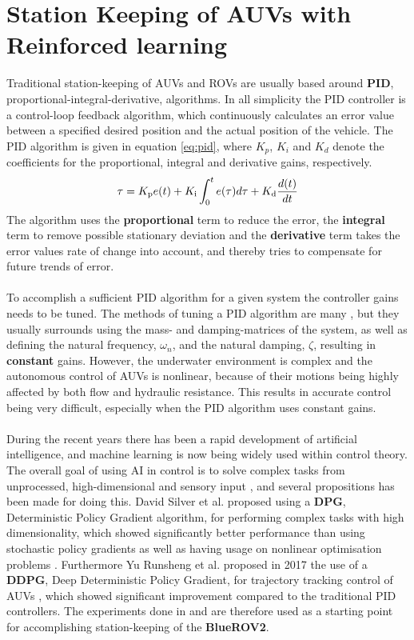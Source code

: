 \chapter{Station Keeping of AUVs with Reinforced learning} \label{chap:station-keeping}
Traditional station-keeping of AUVs and ROVs are usually based around \textbf{PID}, proportional-integral-derivative, algorithms. In all simplicity the PID controller is a control-loop feedback algorithm, which continuously calculates an error value between a specified desired position and the actual position of the vehicle. The PID algorithm is given in equation \ref{eq:pid}, where $K_{p}$, $K_{i}$ and $K_{d}$ denote the coefficients for the proportional, integral and derivative gains, respectively. 
\begin{equation}
\centering
{\displaystyle \tau = K_{\text{p}}e(t)+K_{\text{i}}\int _{0}^{t}e(\tau )d\tau +K_{\text{d}}{\frac {d(t)}{dt}}}
\label{eq:pid}
\end{equation}
The algorithm uses the \textbf{proportional} term to reduce the error, the \textbf{integral} term to remove possible stationary deviation and the \textbf{derivative} term takes the error values rate of change into account, and thereby tries to compensate for future trends of error.\\\\
To accomplish a sufficient PID algorithm for a given system the controller gains needs to be tuned. The methods of tuning a PID algorithm are many \cite{Fossen}, but they usually surrounds using the mass- and damping-matrices of the system, as well as defining the natural frequency, $\omega_{n}$, and the natural damping, $\zeta$, resulting in \textbf{constant} gains. However, the underwater environment is complex and the autonomous control of AUVs is nonlinear, because of their motions being highly affected by both flow and hydraulic resistance. This results in accurate control being very difficult, especially when the PID algorithm uses constant gains.\\\\
During the recent years there has been a rapid development of artificial intelligence, and machine learning is now being widely used within control theory. The overall goal of using AI in control is to solve complex tasks from unprocessed, high-dimensional and sensory input \cite{Lillicrap}, and several propositions has been made for doing this. David Silver et al. proposed using a \textbf{DPG}, Deterministic Policy Gradient algorithm, for performing complex tasks with high dimensionality, which showed significantly better performance than using stochastic policy gradients as well as having usage on nonlinear optimisation problems \cite{David}. Furthermore Yu Runsheng et al. proposed in 2017 the use of a \textbf{DDPG}, Deep Deterministic Policy Gradient, for trajectory tracking control of AUVs \cite{Yu}, which showed significant improvement compared to the traditional PID controllers. The experiments done in \cite{Yu} and \cite{David} are therefore used as a starting point for accomplishing station-keeping of the \textbf{BlueROV2}.
